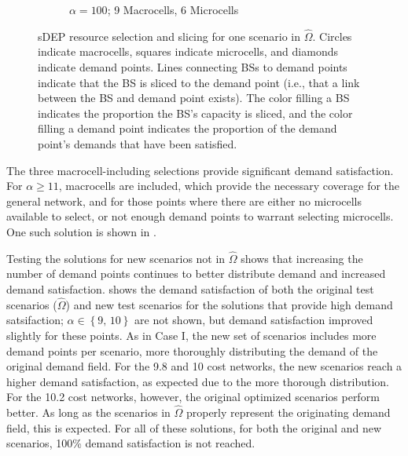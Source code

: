 \documentclass[12pt,dvipsnames]{report}
\begin{document}
\begin{figure}[p]
\begin{subfigure}{.65\textwidth}
		\caption{\small $\alpha = 100$; 9 Macrocells, 6 Microcells}
		\label{fig:CaseII_VoronoiDemandAllocation_sDEP_a100}
	\end{subfigure}
	\caption[Two Case II sDEP resource selection and slicing solutions]{sDEP resource selection and slicing for one scenario in $\hat{\Omega}$.  Circles indicate macrocells, squares indicate microcells, and diamonds indicate demand points.  Lines connecting BSs to demand points indicate that the BS is sliced to the demand point (i.e., that a link between the BS and demand point exists).  The color filling a BS indicates the proportion the BS's capacity is sliced, and the color filling a demand point indicates the proportion of the demand point's demands that have been satisfied.}
	\label{fig:CaseII_VoronoiDemandAllocation_sDEP}
\end{figure}

The three macrocell-including selections provide significant demand satisfaction.  For $\alpha \geq 11$, macrocells are included, which provide the necessary coverage for the general network, and for those points where there are either no microcells available to select, or not enough demand points to warrant selecting microcells.  One such solution is shown in .

Testing the solutions for new scenarios not in $\hat{\Omega}$ shows that increasing the number of demand points continues to better distribute demand and increased demand satisfaction.   shows the demand satisfaction of both the original test scenarios ($\hat{\Omega}$) and new test scenarios for the solutions that provide high demand satsifaction; $\alpha \in \left\{ 9,\, 10 \right\}$ are not shown, but demand satisfaction improved slightly for these points.  As in Case I, the new set of scenarios includes more demand points per scenario, more thoroughly distributing the demand of the original demand field.  For the 9.8 and 10 cost networks, the new scenarios reach a higher demand satisfaction, as expected due to the more thorough distribution.  For the 10.2 cost networks, however, the original optimized scenarios perform better.  As long as the scenarios in $\hat{\Omega}$ properly represent the originating demand field, this is expected.  For all of these solutions, for both the original and new scenarios, 100\% demand satisfaction is not reached.
\end{document}
